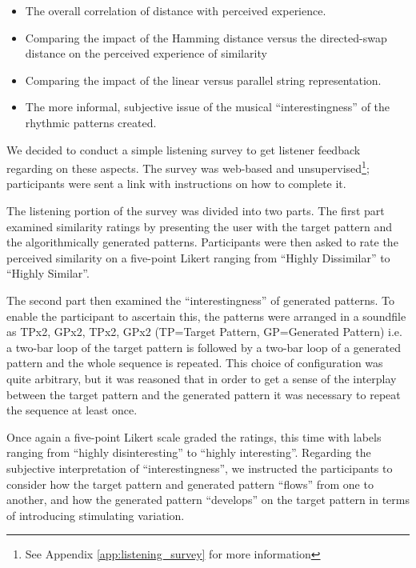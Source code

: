 \begin{itemize}
	\item The overall correlation of distance with perceived experience.
	\item Comparing the impact of the Hamming distance versus the directed-swap distance on the perceived experience of similarity
	\item Comparing the impact of the linear versus parallel string representation.
	\item The more informal, subjective issue of the musical ``interestingness'' of the rhythmic patterns created.
\end{itemize}


We decided to conduct a simple listening survey to get listener feedback regarding on these aspects. The survey was web-based and unsupervised\footnote{See Appendix \ref{app:listening_survey} for more information}; participants were sent a link with instructions on how to complete it. 

The listening portion of the survey was divided into two parts. The first part examined similarity ratings by presenting the user with the target pattern and the algorithmically generated patterns. Participants were then asked to rate the perceived similarity on a five-point Likert ranging from “Highly Dissimilar” to “Highly Similar”.

The second part then examined the “interestingness” of generated patterns. To enable the participant to ascertain this, the  patterns were arranged in a soundfile as TPx2, GPx2, TPx2, GPx2 (TP=Target Pattern, GP=Generated Pattern) i.e. a two-bar loop of the target pattern is followed by a two-bar loop of a generated pattern and the whole sequence is repeated. This choice of configuration was quite arbitrary, but it was reasoned that in order to get a sense of the interplay between the target pattern and the generated pattern it was necessary to repeat the sequence at least once.

Once again a five-point Likert scale graded the ratings, this time with labels ranging from ``highly disinteresting'' to ``highly interesting''. Regarding the subjective interpretation of ``interestingness'', we instructed the participants to consider how the target pattern and generated pattern ``flows'' from one to another, and how the generated pattern ``develops'' on the target pattern in terms of introducing stimulating variation.

